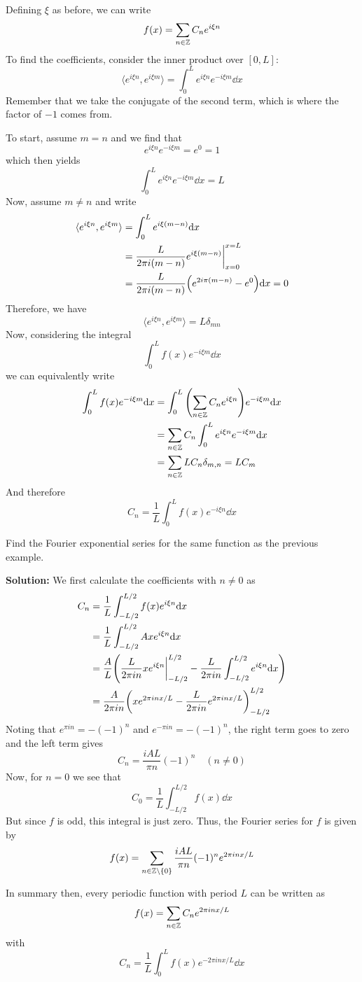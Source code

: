 Defining $\xi$ as before, we can write
\[ f(x) = \sum_{n\in\mathbb{Z}} C_ne^{i\xi n}\]
To find the coefficients, consider the inner product over $[0,L]$:
\[ \langle e^{i\xi n}, e^{i\xi m}\rangle = \int_0^L e^{i\xi n}e^{-i\xi m}\dd x \]
Remember that we take the conjugate of the second term, which is where the factor of $-1$ comes from.

To start, assume $m = n$ and we find that
\[ e^{i\xi n}e^{-i\xi m} = e^0 = 1 \]
which then yields
\[ \int_0^L e^{i\xi n}e^{-i\xi m}\dd x = L \]
Now, assume $m\ne n$ and write
\begin{align*}
    \langle e^{i\xi n}, e^{i\xi m}\rangle &= \int_0^L e^{i\xi(m-n)}\dd x \\
    &= \frac{L}{2\pi i(m-n)}e^{i\xi(m-n)}\biggr|_{x=0}^{x=L} \\
    &= \frac{L}{2\pi i(m-n)}\pqty{e^{2i\pi (m-n)} - e^0}\dd x = 0
\end{align*}
Therefore, we have
\[ \langle e^{i\xi n}, e^{i\xi m}\rangle = L\delta_{mn} \]
Now, considering the integral
\[ \int_0^L f(x) e^{-i\xi m}\dd x\]
we can equivalently write
\begin{align*}
    \int_0^L f(x)e^{-i\xi m}\dd x &= \int_0^L \pqty{\sum_{n\in\Z}C_ne^{i\xi n}}e^{-i\xi m}\dd x \\
    &= \sum_{n\in\Z} C_n\int_0^L e^{i\xi n}e^{-i\xi m}\dd x \\
    &= \sum_{n\in\Z} LC_n\delta_{m,n} = LC_m
\end{align*}
And therefore
\[ C_n = \frac{1}{L}\int_0^L f(x)e^{-i\xi n}\dd x\]
\begin{example}
    Find the Fourier exponential series for the same function as the previous example.

    \textbf{Solution:} We first calculate the coefficients with $n\ne 0$ as
    \begin{align*}
        C_n &= \frac{1}{L}\int_{-L/2}^{L/2} f(x)e^{i\xi n}\dd x \\
        &= \frac{1}{L} \int_{-L/2}^{L/2} Axe^{i\xi n}\dd x \\
        &= \frac{A}{L} \pqty{\frac{L}{2\pi i n}xe^{i\xi n}\biggr|_{-L/2}^{L/2} - \frac{L}{2\pi i n}\int_{-L/2}^{L/2} e^{i\xi n}\dd x} \\
        &= \frac{A}{2\pi in}\pqty{xe^{2\pi inx/L}- \frac{L}{2\pi in}e^{2\pi inx/L}}_{-L/2}^{L/2}
    \end{align*}
    Noting that $e^{\pi i n} = -(-1)^n$ and $e^{-\pi in} = -(-1)^n$, the right term goes to zero and the left term gives
    \[ C_n = \frac{iAL}{\pi n}(-1)^n \quad(n\ne 0)\]
    Now, for $n=0$ we see that 
    \[ C_0 = \frac{1}{L}\int_{-L/2}^{L/2} f(x)\dd x\]
    But since $f$ is odd, this integral is just zero. Thus, the Fourier series for $f$ is given by
    \[ f(x) = \sum_{n\in\mathbb{Z}\setminus\{0\} } \frac{iAL}{\pi n}(-1)^n e^{2\pi inx/L} \]
\end{example}
In summary then, every periodic function with period $L$ can be written as
\[ f(x) = \sum_{n\in\mathbb{Z}} C_ne^{2\pi inx/L} \]
with
\[ C_n = \frac{1}{L}\int_0^L f(x)e^{-2\pi in x/L}\dd x\]
